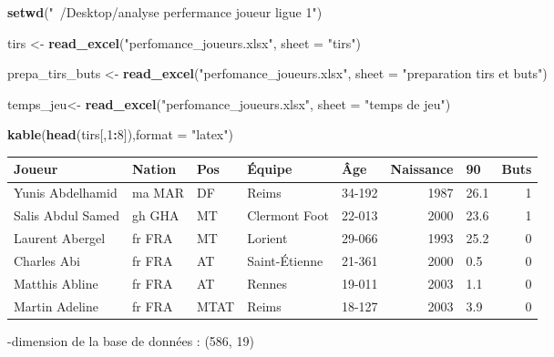 \documentclass[7pt,]{report}
\newenvironment{Shaded}{\begin{snugshade}}{\end{snugshade}}
\newcommand{\DataTypeTok}[1]{\textcolor[rgb]{0.13,0.29,0.53}{#1}}
\newcommand{\DecValTok}[1]{\textcolor[rgb]{0.00,0.00,0.81}{#1}}
\newcommand{\KeywordTok}[1]{\textcolor[rgb]{0.13,0.29,0.53}{\textbf{#1}}}
\newcommand{\NormalTok}[1]{#1}
\newcommand{\OperatorTok}[1]{\textcolor[rgb]{0.81,0.36,0.00}{\textbf{#1}}}
\newcommand{\StringTok}[1]{\textcolor[rgb]{0.31,0.60,0.02}{#1}}
\begin{document}
\begin{Shaded}
\begin{Highlighting}[]
\KeywordTok{setwd}\NormalTok{(}\StringTok{"~/Desktop/analyse perfermance joueur ligue 1"}\NormalTok{)}

\NormalTok{tirs <-}\StringTok{ }\KeywordTok{read_excel}\NormalTok{(}\StringTok{"perfomance_joueurs.xlsx"}\NormalTok{, }
                                 \DataTypeTok{sheet =} \StringTok{"tirs"}\NormalTok{)}

\NormalTok{prepa_tirs_buts <-}\StringTok{ }\KeywordTok{read_excel}\NormalTok{(}\StringTok{"perfomance_joueurs.xlsx"}\NormalTok{, }
                   \DataTypeTok{sheet =} \StringTok{"preparation tirs et buts"}\NormalTok{)}

\NormalTok{temps_jeu<-}\StringTok{ }\KeywordTok{read_excel}\NormalTok{(}\StringTok{"perfomance_joueurs.xlsx"}\NormalTok{, }
                              \DataTypeTok{sheet =} \StringTok{"temps de jeu"}\NormalTok{)}
\end{Highlighting}
\end{Shaded}

\begin{Shaded}
\begin{Highlighting}[]
\KeywordTok{kable}\NormalTok{(}\KeywordTok{head}\NormalTok{(tirs[,}\DecValTok{1}\OperatorTok{:}\DecValTok{8}\NormalTok{]),}\DataTypeTok{format =} \StringTok{"latex"}\NormalTok{)}
\end{Highlighting}
\end{Shaded}

\begin{tabular}{l|l|l|l|l|r|l|r}
\hline
Joueur & Nation & Pos & Équipe & Âge & Naissance & 90 & Buts\\
\hline
Yunis Abdelhamid & ma MAR & DF & Reims & 34-192 & 1987 & 26.1 & 1\\
\hline
Salis Abdul Samed & gh GHA & MT & Clermont Foot & 22-013 & 2000 & 23.6 & 1\\
\hline
Laurent Abergel & fr FRA & MT & Lorient & 29-066 & 1993 & 25.2 & 0\\
\hline
Charles Abi & fr FRA & AT & Saint-Étienne & 21-361 & 2000 & 0.5 & 0\\
\hline
Matthis Abline & fr FRA & AT & Rennes & 19-011 & 2003 & 1.1 & 0\\
\hline
Martin Adeline & fr FRA & MTAT & Reims & 18-127 & 2003 & 3.9 & 0\\
\hline
\end{tabular}

-dimension de la base de données : (586, 19)
\end{document}
